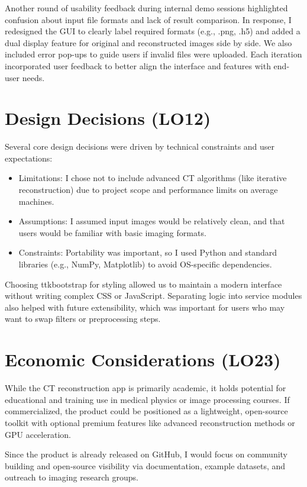 \documentclass{article}
\begin{document}
Another round of usability feedback during internal demo sessions highlighted confusion about input file formats and lack of result comparison. In response, I redesigned the GUI to clearly label required formats (e.g., .png, .h5) and added a dual display feature for original and reconstructed images side by side. We also included error pop-ups to guide users if invalid files were uploaded. Each iteration incorporated user feedback to better align the interface and features with end-user needs.


\section{Design Decisions (LO12)}

Several core design decisions were driven by technical constraints and user expectations:

\begin{itemize}
\item Limitations: I chose not to include advanced CT algorithms (like iterative
  reconstruction) due to project scope and performance limits on average
  machines.
\item Assumptions: I assumed input images would be relatively clean, and that
  users would be familiar with basic imaging formats.
\item Constraints: Portability was important, so I used Python and standard
  libraries (e.g., NumPy, Matplotlib) to avoid OS-specific dependencies.
\end{itemize}
Choosing ttkbootstrap for styling allowed us to maintain a modern interface without writing complex CSS or JavaScript. Separating logic into service modules also helped with future extensibility, which was important for users who may want to swap filters or preprocessing steps.

\section{Economic Considerations (LO23)}
While the CT reconstruction app is primarily academic, it holds potential for
educational and training use in medical physics or image processing courses. If
commercialized, the product could be positioned as a lightweight, open-source
toolkit with optional premium features like advanced reconstruction methods or
GPU acceleration.

Since the product is already released on GitHub, I would focus on community
building and open-source visibility via documentation, example datasets, and
outreach to imaging research groups.
\end{document}
